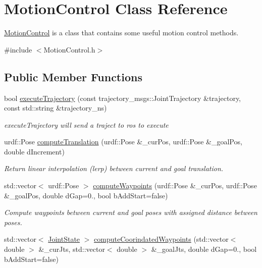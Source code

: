 \hypertarget{classMotionControl}{\section{Motion\-Control Class Reference}
\label{classMotionControl}
}


\hyperlink{classMotionControl}{Motion\-Control} is a class that contains some useful motion control methods.  




{\ttfamily \#include $<$Motion\-Control.\-h$>$}

\subsection*{Public Member Functions}
\begin{DoxyCompactItemize}
\item 
bool \hyperlink{classMotionControl_a7d4bdb16c10626850dac271d30428f71}{execute\-Trajectory} (const trajectory\-\_\-msgs\-::\-Joint\-Trajectory \&trajectory, const std\-::string \&trajectory\-\_\-ns)
\begin{DoxyCompactList}\small\item\em execute\-Trajectory will send a traject to ros to execute \end{DoxyCompactList}\item 
urdf\-::\-Pose \hyperlink{classMotionControl_a046ca7499b1bd4e6badf680584ae714d}{compute\-Translation} (urdf\-::\-Pose \&\-\_\-cur\-Pos, urdf\-::\-Pose \&\-\_\-goal\-Pos, double d\-Increment)
\begin{DoxyCompactList}\small\item\em Return linear interpolation (lerp) between current and goal translation. \end{DoxyCompactList}\item 
std\-::vector$<$ urdf\-::\-Pose $>$ \hyperlink{classMotionControl_a06d93063a4a65f581cf0368faddeb246}{compute\-Waypoints} (urdf\-::\-Pose \&\-\_\-cur\-Pos, urdf\-::\-Pose \&\-\_\-goal\-Pos, double d\-Gap=0., bool b\-Add\-Start=false)
\begin{DoxyCompactList}\small\item\em Compute waypoints between current and goal poses with assigned distance between poses. \end{DoxyCompactList}\item 
std\-::vector$<$ \hyperlink{RCS_8h_aa4adb93a26caa4dacba9c9614e283245}{Joint\-State} $>$ \hyperlink{classMotionControl_aebf1d77a70bbf6817f0899a98173b87d}{compute\-Coorindated\-Waypoints} (std\-::vector$<$ double $>$ \&\-\_\-cur\-Jts, std\-::vector$<$ double $>$ \&\-\_\-goal\-Jts, double d\-Gap=0., bool b\-Add\-Start=false)

\end{DoxyCompactItemize}
